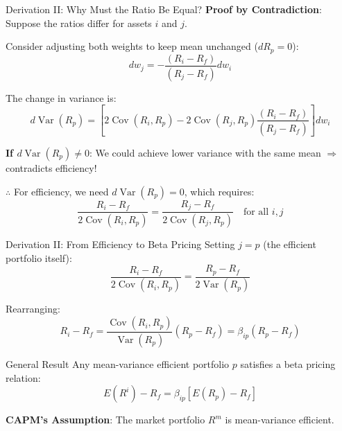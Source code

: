 \documentclass{beamer}
\begin{document}
\begin{frame}{Derivation II: Why Must the Ratio Be Equal?}
	\textbf{Proof by Contradiction}: Suppose the ratios differ for assets $i$ and $j$.
	
	\vspace{8pt}
	Consider adjusting both weights to keep mean unchanged ($dR_p = 0$):
	\begin{equation*}
		dw_j = -\frac{(R_i - R_f)}{(R_j - R_f)} dw_i
	\end{equation*}
	
	\vspace{5pt}
	The change in variance is:
	\begin{equation*}
		d\operatorname{Var}(R_p) = \left[2\operatorname{Cov}(R_i, R_p) - 2\operatorname{Cov}(R_j, R_p)\frac{(R_i - R_f)}{(R_j - R_f)}\right]dw_i
	\end{equation*}
	
	\vspace{8pt}
	\textbf{If $d\operatorname{Var}(R_p) \neq 0$}: We could achieve lower variance with the same mean $\Rightarrow$ contradicts efficiency!
	
	\vspace{8pt}
	$\therefore$ For efficiency, we need $d\operatorname{Var}(R_p) = 0$, which requires:
	\begin{equation*}
		\frac{R_i - R_f}{2\operatorname{Cov}(R_i, R_p)} = \frac{R_j - R_f}{2\operatorname{Cov}(R_j, R_p)} \quad \text{for all } i, j
	\end{equation*}
\end{frame}

\begin{frame}{Derivation II: From Efficiency to Beta Pricing}
	Setting $j = p$ (the efficient portfolio itself):
	\begin{equation*}
		\frac{R_i - R_f}{2\operatorname{Cov}(R_i, R_p)} = \frac{R_p - R_f}{2\operatorname{Var}(R_p)}
	\end{equation*}
	
	\vspace{5pt}
	Rearranging:
	\begin{equation*}
		R_i - R_f = \frac{\operatorname{Cov}(R_i, R_p)}{\operatorname{Var}(R_p)}(R_p - R_f) = \beta_{ip}(R_p - R_f)
	\end{equation*}
	
	\vspace{8pt}
	\begin{block}{General Result}
		Any mean-variance efficient portfolio $p$ satisfies a beta pricing relation:
		\begin{equation*}
			E(R^i) - R_f = \beta_{ip}[E(R_p) - R_f]
		\end{equation*}
	\end{block}

	\textbf{CAPM's Assumption}: The \alert{market portfolio} $R^m$ is mean-variance efficient.
\end{frame}
\end{document}
